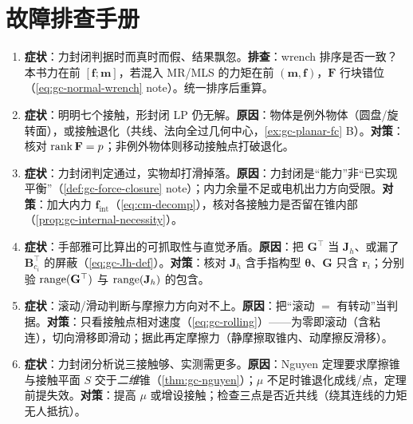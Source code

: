 \section*{故障排查手册}
\begin{enumerate}
  \item \textbf{症状}：力封闭判据时而真时而假、结果飘忽。\textbf{排查}：wrench 排序是否一致？本书力在前 $[\mathbf{f};\mathbf{m}]$，若混入 MR/MLS 的力矩在前 $(\mathbf{m},\mathbf{f})$，$\mathbf{F}$ 行块错位（\cref{eq:gc-normal-wrench} note）。统一排序后重算。
  \item \textbf{症状}：明明七个接触，形封闭 LP 仍无解。\textbf{原因}：物体是例外物体（圆盘/旋转面），或接触退化（共线、法向全过几何中心，\cref{ex:gc-planar-fc} B）。\textbf{对策}：核对 $\operatorname{rank}\mathbf{F}=p$；非例外物体则移动接触点打破退化。
  \item \textbf{症状}：力封闭判定通过，实物却打滑掉落。\textbf{原因}：力封闭是“能力”非“已实现平衡”（\cref{def:gc-force-closure} note）；内力余量不足或电机出力方向受限。\textbf{对策}：加大内力 $\mathbf{f}_{\text{int}}$（\cref{eq:cm-decomp}），核对各接触力是否留在锥内部（\cref{prop:gc-internal-necessity}）。
  \item \textbf{症状}：手部雅可比算出的可抓取性与直觉矛盾。\textbf{原因}：把 $\mathbf{G}^\top$ 当 $\mathbf{J}_h$、或漏了 $\mathbf{B}_{c_i}^\top$ 的屏蔽（\cref{eq:gc-Jh-def}）。\textbf{对策}：核对 $\mathbf{J}_h$ 含手指构型 $\boldsymbol{\theta}$、$\mathbf{G}$ 只含 $\mathbf{r}_i$；分别验 $\operatorname{range}(\mathbf{G}^\top)$ 与 $\operatorname{range}(\mathbf{J}_h)$ 的包含。
  \item \textbf{症状}：滚动/滑动判断与摩擦力方向对不上。\textbf{原因}：把“滚动 $=$ 有转动”当判据。\textbf{对策}：只看接触点相对速度（\cref{eq:gc-rolling}）——为零即滚动（含粘连），切向滑移即滑动；据此再定摩擦力（静摩擦取锥内、动摩擦反滑移）。
  \item \textbf{症状}：力封闭分析说三接触够、实测需更多。\textbf{原因}：Nguyen 定理要求摩擦锥与接触平面 $S$ 交于\emph{二维}锥（\cref{thm:gc-nguyen}）；$\mu$ 不足时锥退化成线/点，定理前提失效。\textbf{对策}：提高 $\mu$ 或增设接触；检查三点是否近共线（绕其连线的力矩无人抵抗）。
\end{enumerate}
